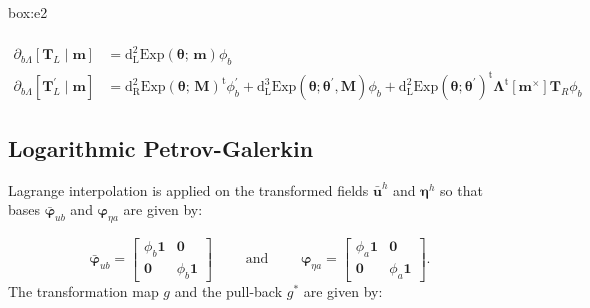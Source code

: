 \begin{ambox}[E2]{box:e2}
\begin{enumerate}
\begin{equation*}
\begin{aligned}
   \\
   \partial_{b \scriptscriptstyle{\Lambda}}  \left[\mathbf{T}_{\scriptscriptstyle{L}}\mid\bm{m}\right] 
   &=
       \operatorname{d^2_{\scriptscriptstyle{L}}Exp}\left(\bm{\theta};\, \bm{m}\right) \phi_b \\
   \partial_{b \scriptscriptstyle{\Lambda}}  \left[\mathbf{T}_{\scriptscriptstyle{L}}^\prime \mid \bm{m}\right]
   &= \operatorname{d^2_{\scriptscriptstyle{R}}Exp}(\bm{\theta};\, \bm{M})^{\mathrm{t}} \phi_b^\prime %
   + \operatorname{d^3_{\scriptscriptstyle{L}}Exp}(\bm{\theta}; \bm{\theta}^{\prime},\bm{M}) \phi_b
       +  \operatorname{d^2_{\scriptscriptstyle{L}}Exp}(\bm{\theta}; \bm{\theta}^\prime)^{\mathrm{t}}\bm{\Lambda}^{\mathrm{t}} [\bm{m}^\times] \mathbf{T}_{\scriptscriptstyle{R}} \phi_b
   \end{aligned}
   \end{equation*}
\end{enumerate}
\end{ambox}

\hypertarget{sec:element-cj2}{%
\subsection{Logarithmic Petrov-Galerkin}\label{sec:element-cj2}}

Lagrange interpolation is applied on the transformed fields
\(\bar{\bm{u}}^h\) and \(\bm{\eta}^h\) so that bases
\(\bar{\bm{\varphi}}_{u b}\) and \(\bm{\varphi}^{}_{\eta a}\) are given
by:

\begin{equation}
\bar{\bm{\varphi}}_{u b} = \begin{bmatrix}
    \phi_b \mathbf{1} & \mathbf{0} \\
    \mathbf{0} & \phi_b \mathbf{1}
\end{bmatrix}
\qquad\text{ and }\qquad
\bm{\varphi}^{}_{\eta a} = 
    \begin{bmatrix}
    \phi_a \mathbf{1} & \mathbf{0} \\
    \mathbf{0} & \phi_a \mathbf{1}
\end{bmatrix}.
\label{eq:interp-cj2}\end{equation}
The transformation map \(g\) and the pull-back \(g^*\) are given by:

